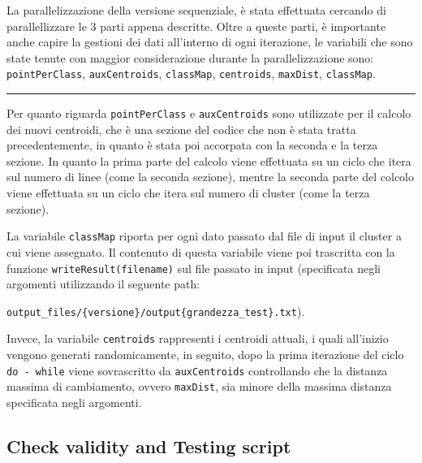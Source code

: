 \documentclass{article}
\begin{document}
  La parallelizzazione della versione sequenziale, è stata effettuata cercando di parallellizzare le 3 parti appena descritte.
  Oltre a queste parti, è importante anche capire la gestioni dei dati all'interno di ogni iterazione, le variabili 
  che sono state tenute con maggior considerazione durante la parallelizzazione sono: \verb|pointPerClass|, \verb|auxCentroids|,
  \verb|classMap|, \verb|centroids|, \verb|maxDist|, \verb|classMap|.
  \begin{center}
    \rule{6cm}{1pt}
  \end{center}
  Per quanto riguarda \verb|pointPerClass| e \verb|auxCentroids| sono utilizzate per il calcolo dei nuovi centroidi, che è una sezione 
  del codice che non è stata tratta precedentemente, in quanto è stata poi accorpata con la seconda e la terza sezione. In quanto la prima parte 
  del calcolo viene effettuata su un ciclo che itera sul numero di linee (come la seconda sezione), mentre la seconda parte del colcolo viene effettuata 
  su un ciclo che itera sul numero di cluster (come la terza sezione).
  
  La variabile \verb|classMap| riporta per ogni dato passato dal file di input il cluster a cui viene assegnato. Il contenuto di questa variabile 
  viene poi trascritta con la funzione \verb|writeResult(filename)| sul file passato in input (specificata negli argomenti utilizzando il seguente path:
  \begin{center}
    \verb|output_files/{versione}/output{grandezza_test}.txt|).
  \end{center}
  Invece, la variabile \verb|centroids| rappresenti i centroidi attuali, i quali all'inizio vengono generati randomicamente, in seguito, dopo la prima iterazione del ciclo
  \verb|do - while| viene sovrascritto da \verb|auxCentroids| controllando che la distanza massima di cambiamento, ovvero \verb|maxDist|, sia minore della massima distanza specificata
  negli argomenti.

  \subsection{Check validity and Testing script}
\end{document}
